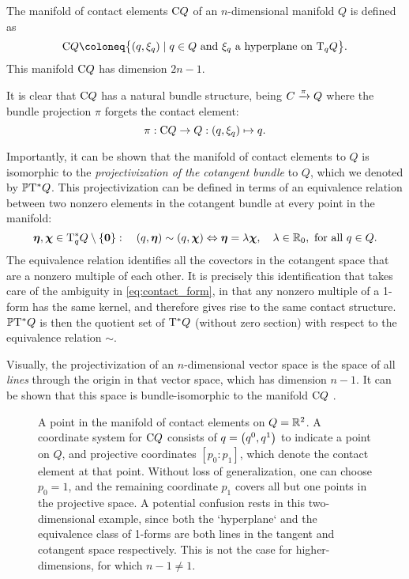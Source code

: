 The manifold of contact elements $\mathrm{C}Q$ of an \(n\)-dimensional manifold $Q$ is defined as \cite{Cannas2001}
\begin{equation}
     \cbundle{Q} \coloneq \big\{(q, \xi_q) \mid q \in Q \text{ and } \xi_q \text{ a hyperplane on } \tspace{q}{Q}\big\}.
\end{equation}
This manifold \(\mathrm{C}Q\) has dimension \(2n - 1\). 

It is clear that \(\mathrm{C}Q\) has a natural bundle structure, being \(C\xrightarrow[]{\pi}Q\) where the bundle projection $\pi$ forgets the contact element:
\begin{equation}
     \pi: \mathrm{C}Q \to {Q}: (q, \xi_q) \mapsto q.
\end{equation}

Importantly, it can be shown that the manifold of contact elements to $Q$ is isomorphic to the \emph{projectivization of the cotangent bundle} to \(Q\), which we denoted by \(\mathbb{P}\mathrm{T}^* Q\). This projectivization can be defined in terms of an equivalence relation between two nonzero elements in the cotangent bundle at every point in the manifold:
\begin{equation}
     \vec{\eta},\vec{\chi}\in \ctspace{q}{Q} \setminus \{\mathbf{0}\}:\quad (q, \vec{\eta}) \sim (q, \vec{\chi}) \Leftrightarrow \vec{\eta} = \lambda \vec{\chi},\quad \lambda \in \real_0, \text{ for all } q \in Q.
\end{equation}
The equivalence relation identifies all the covectors in the cotangent space that are a nonzero multiple of each other. It is precisely this identification that takes care of the ambiguity in \cref{eq:contact_form}, in that any nonzero multiple of a 1-form has the same kernel, and therefore gives rise to the same contact structure. \(\mathbb{P}\mathrm{T}^* Q\) is then the quotient set of \(\mathrm{T}^*Q\) (without zero section) with respect to the equivalence relation \(\sim\). 

Visually, the projectivization of an \(n\)-dimensional vector space is the space of all \emph{lines} through the origin in that vector space, which has dimension \(n - 1\). It can be shown that this space is bundle-isomorphic to the manifold \(\mathrm{C}Q\) \cite{Cannas2001}.

\begin{figure}[ht!]
    \centering
    
    \caption{A point in the manifold of contact elements on \(Q = \mathbb{R}^2\). A coordinate system for \(\mathrm{C}Q\) consists of \(q = \qty(q^0, q^1)\) to indicate a point on \(Q\), and projective coordinates \([p_0:p_1]\), which denote the contact element at that point. Without loss of generalization, one can choose \(p_0 = 1\), and the remaining coordinate \(p_1\) covers all but one points in the projective space. A potential confusion rests in this two-dimensional example, since both the `hyperplane` and the equivalence class of 1-forms are both lines in the tangent and cotangent space respectively. This is not the case for higher-dimensions, for which \(n - 1 \neq 1\).}
    \label{fig:contact_element}
\end{figure}

